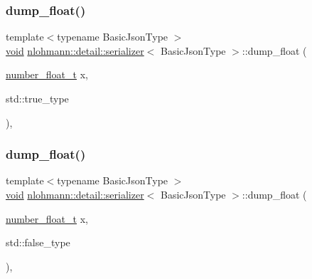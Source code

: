 \subsubsection{\texorpdfstring{dump\+\_\+float()}{dump\_float()}\hspace{0.1cm}{\footnotesize\ttfamily [2/3]}}
{\footnotesize\ttfamily template$<$typename Basic\+Json\+Type $>$ \\
\hyperlink{namespacenlohmann_1_1detail_a59fca69799f6b9e366710cb9043aa77d}{void} \hyperlink{classnlohmann_1_1detail_1_1serializer}{nlohmann\+::detail\+::serializer}$<$ Basic\+Json\+Type $>$\+::dump\+\_\+float (\begin{DoxyParamCaption}\item[{\hyperlink{classnlohmann_1_1detail_1_1serializer_a460c6794fbabbb2ae83380e987a6c030}{number\+\_\+float\+\_\+t}}]{x,  }\item[{std\+::true\+\_\+type}]{ }\end{DoxyParamCaption})\hspace{0.3cm}{\ttfamily [inline]}, {\ttfamily [private]}}

\mbox{\label{classnlohmann_1_1detail_1_1serializer_a331dad892fc00313f928fdaa6bc8f849}} 
\subsubsection{\texorpdfstring{dump\+\_\+float()}{dump\_float()}\hspace{0.1cm}{\footnotesize\ttfamily [3/3]}}
{\footnotesize\ttfamily template$<$typename Basic\+Json\+Type $>$ \\
\hyperlink{namespacenlohmann_1_1detail_a59fca69799f6b9e366710cb9043aa77d}{void} \hyperlink{classnlohmann_1_1detail_1_1serializer}{nlohmann\+::detail\+::serializer}$<$ Basic\+Json\+Type $>$\+::dump\+\_\+float (\begin{DoxyParamCaption}\item[{\hyperlink{classnlohmann_1_1detail_1_1serializer_a460c6794fbabbb2ae83380e987a6c030}{number\+\_\+float\+\_\+t}}]{x,  }\item[{std\+::false\+\_\+type}]{ }\end{DoxyParamCaption})\hspace{0.3cm}{\ttfamily [inline]}, {\ttfamily [private]}}

